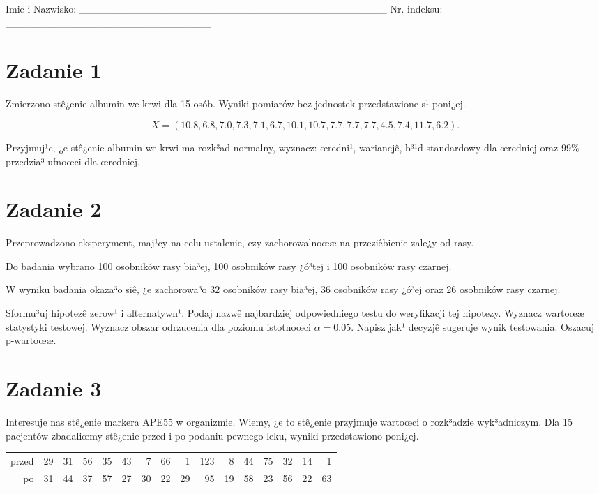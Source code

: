 \documentclass[a4paper,12pt]{article}
\begin{document}
 Imie i Nazwisko: \_\_\_\_\_\_\_\_\_\_\_\_\_\_\_\_\_\_\_\_\_\_\_\_\_\_\_\_\_\_\_\_\_\_\_\_\_\_\_\_\_\_ Nr. indeksu: \_\_\_\_\_\_\_\_\_\_\_\_\_\_\_\_\_\_\_\_\_\_\_\_\_\_\_\_ 
 \section*{Zadanie 1}
     
     Zmierzono stê¿enie albumin we krwi dla 15 osób. 
     Wyniki pomiarów bez jednostek przedstawione s¹ poni¿ej. 
     
     \noindent $$X=( 10.8,  6.8,  7.0,  7.3,  7.1,  6.7, 10.1, 10.7,  7.7,  7.7,  7.7,  4.5,  7.4, 11.7,  6.2 ).$$
     
     Przyjmuj¹c, ¿e stê¿enie albumin we krwi ma rozk³ad normalny, 
     wyznacz: œredni¹, wariancjê, b³¹d standardowy dla œredniej oraz 99\% przedzia³ ufnoœci dla œredniej. \vspace{1cm} 

  \section*{Zadanie 2}
     
  Przeprowadzono eksperyment, maj¹cy na celu ustalenie, czy zachorowalnoœæ na przeziêbienie zale¿y od rasy.
  
  Do badania wybrano 100 osobników rasy bia³ej, 100 osobników rasy ¿ó³tej i 100 osobników rasy czarnej. 
  
  W wyniku badania okaza³o siê, ¿e zachorowa³o 32 osobników rasy bia³ej, 36 osobników rasy ¿ó³ej oraz 26 osobników rasy czarnej. 
  
  Sformu³uj hipotezê zerow¹ i alternatywn¹. 
  Podaj nazwê najbardziej odpowiedniego testu do weryfikacji tej hipotezy. 
  Wyznacz wartoœæ statystyki testowej. 
  Wyznacz obszar odrzucenia dla poziomu istotnoœci $\alpha=0.05$. 
  Napisz jak¹ decyzjê sugeruje wynik testowania. Oszacuj p-wartoœæ. \vspace{1cm} 

  \section*{Zadanie 3}
     
  Interesuje nas stê¿enie markera APE55  w organizmie. 
  Wiemy, ¿e to stê¿enie przyjmuje wartoœci o rozk³adzie wyk³adniczym. 
  Dla 15 pacjentów zbadaliœmy stê¿enie przed i po podaniu pewnego leku, 
  wyniki przedstawiono poni¿ej.
  
  \vspace{0.5cm} 
  \noindent\begin{center} 
\begin{tabular}{rrrrrrrrrrrrrrrr}
  \hline
  \hline
przed & 29 & 31 & 56 & 35 & 43 & 7 & 66 & 1 & 123 & 8 & 44 & 75 & 32 & 14 & 1 \\
  po & 31 & 44 & 37 & 57 & 27 & 30 & 22 & 29 & 95 & 19 & 58 & 23 & 56 & 22 & 63 \\
   \hline
\end{tabular}
 
  \end{center} 
  \vspace{0.5cm}
  
\end{document}
